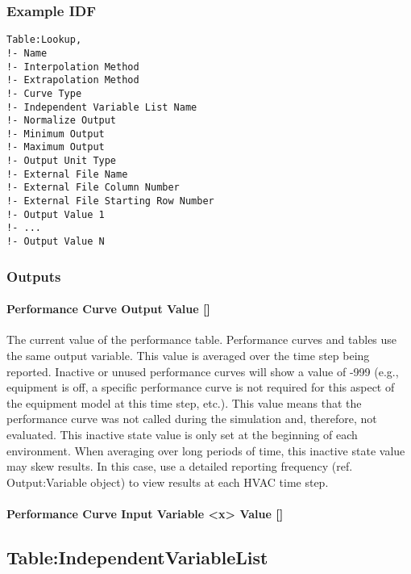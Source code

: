 \subsubsection{Example IDF}\label{example-idf}

\begin{verbatim}
Table:Lookup,
!- Name
!- Interpolation Method
!- Extrapolation Method
!- Curve Type
!- Independent Variable List Name
!- Normalize Output
!- Minimum Output
!- Maximum Output
!- Output Unit Type
!- External File Name
!- External File Column Number
!- External File Starting Row Number
!- Output Value 1
!- ...
!- Output Value N
\end{verbatim}

\subsubsection{Outputs}\label{outputs}

\paragraph{Performance Curve Output Value
{[}{]}}\label{performance-curve-output-value}

The current value of the performance table. Performance curves and
tables use the same output variable. This value is averaged over the
time step being reported. Inactive or unused performance curves will
show a value of -999 (e.g., equipment is off, a specific performance
curve is not required for this aspect of the equipment model at this
time step, etc.). This value means that the performance curve was not
called during the simulation and, therefore, not evaluated. This
inactive state value is only set at the beginning of each environment.
When averaging over long periods of time, this inactive state value may
skew results. In this case, use a detailed reporting frequency (ref.
Output:Variable object) to view results at each HVAC time step.

\paragraph{Performance Curve Input Variable
\textless{}x\textgreater{} Value
{[}{]}}\label{performance-curve-input-variable-x-value}

\subsection{Table:IndependentVariableList}\label{tableindependentvariablelist}

